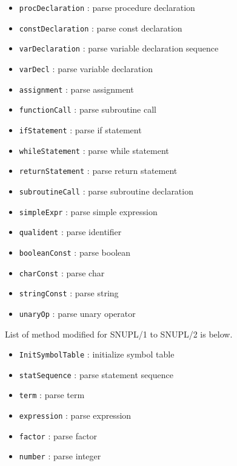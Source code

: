 \documentclass[12pt]{article}
\begin{document}
\begin{itemize}
    \item \texttt{procDeclaration} : parse procedure declaration
    \item \texttt{constDeclaration} : parse const declaration
    \item \texttt{varDeclaration} : parse variable declaration sequence
    \item \texttt{varDecl} : parse variable declaration\\
    \item \texttt{assignment} : parse assignment
    \item \texttt{functionCall} : parse subroutine call
    \item \texttt{ifStatement} : parse if statement
    \item \texttt{whileStatement} : parse while statement
    \item \texttt{returnStatement} : parse return statement
    \item \texttt{subroutineCall} : parse subroutine declaration\\
    \item \texttt{simpleExpr} : parse simple expression
    \item \texttt{qualident} : parse identifier
    \item \texttt{booleanConst} : parse boolean
    \item \texttt{charConst} : parse char
    \item \texttt{stringConst} : parse string
    \item \texttt{unaryOp} : parse unary operator
\end{itemize}
List of method modified for SNUPL/1 to SNUPL/2 is below.
\begin{itemize}
    \item \texttt{InitSymbolTable} : initialize symbol table
    \item \texttt{statSequence} : parse statement sequence
    \item \texttt{term} : parse term
    \item \texttt{expression} : parse expression
    \item \texttt{factor} : parse factor
    \item \texttt{number} : parse integer    
\end{itemize}
\end{document}
